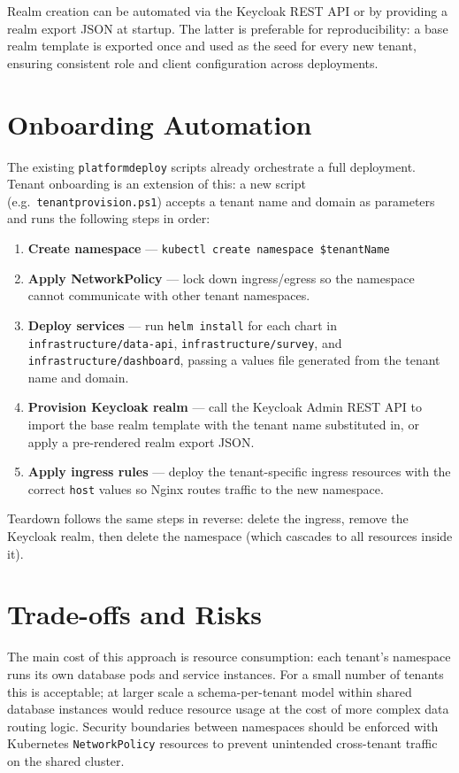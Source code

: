 Realm creation can be automated via the Keycloak REST API or by providing a realm export JSON at startup. The latter is preferable for reproducibility: a base realm template is exported once and used as the seed for every new tenant, ensuring consistent role and client configuration across deployments.

\section{Onboarding Automation}

The existing \texttt{platformdeploy} scripts already orchestrate a full deployment. Tenant onboarding is an extension of this: a new script (e.g.\ \texttt{tenantprovision.ps1}) accepts a tenant name and domain as parameters and runs the following steps in order:

\begin{enumerate}
    \item \textbf{Create namespace} --- \texttt{kubectl create namespace \$tenantName}
    \item \textbf{Apply NetworkPolicy} --- lock down ingress/egress so the namespace cannot communicate with other tenant namespaces.
    \item \textbf{Deploy services} --- run \texttt{helm install} for each chart in \texttt{infrastructure/data-api}, \texttt{infrastructure/survey}, and \texttt{infrastructure/dashboard}, passing a values file generated from the tenant name and domain.
    \item \textbf{Provision Keycloak realm} --- call the Keycloak Admin REST API to import the base realm template with the tenant name substituted in, or apply a pre-rendered realm export JSON.
    \item \textbf{Apply ingress rules} --- deploy the tenant-specific ingress resources with the correct \texttt{host} values so Nginx routes traffic to the new namespace.
\end{enumerate}

Teardown follows the same steps in reverse: delete the ingress, remove the Keycloak realm, then delete the namespace (which cascades to all resources inside it).

\section{Trade-offs and Risks}

The main cost of this approach is resource consumption: each tenant's namespace runs its own database pods and service instances. For a small number of tenants this is acceptable; at larger scale a schema-per-tenant model within shared database instances would reduce resource usage at the cost of more complex data routing logic. Security boundaries between namespaces should be enforced with Kubernetes \texttt{NetworkPolicy} resources to prevent unintended cross-tenant traffic on the shared cluster.
